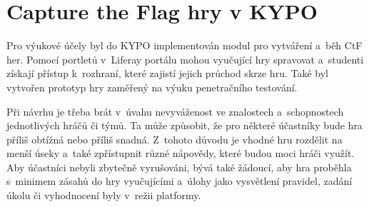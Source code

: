 \documentclass[
  digital, %
  oneside, %
  table,   %
  nolof,     %
  nolot,     %
  nocover
]{fithesis3}
\begin{document}
\section{Capture the Flag hry v KYPO} \label{ctfGamesKYPO}
Pro výukové účely byl do KYPO implementován modul pro vytváření a~běh CtF her. Pomocí portletů v~Liferay portálu mohou vyučující hry spravovat a~studenti získají přístup k~rozhraní, které zajistí jejich průchod skrze hru. Také byl vytvořen prototyp hry zaměřený na výuku penetračního testování.\par
Při návrhu je třeba brát v~úvahu nevyváženost ve znalostech a~schopnostech jednotlivých hráčů či týmů. Ta může způsobit, že pro některé účastníky bude hra příliš obtížná nebo příliš snadná. Z~tohoto důvodu je vhodné hru rozdělit na menší úseky a~také zpřístupnit různé nápovědy, které budou moci hráči využít. Aby účastníci nebyli zbytečně vyrušováni, bývá také žádoucí, aby hra proběhla s~minimem zásahů do hry vyučujícími a~úlohy jako vysvětlení pravidel, zadání úkolu či vyhodnocení byly v~režii platformy. \cite{ctfDesign} 
\end{document}
